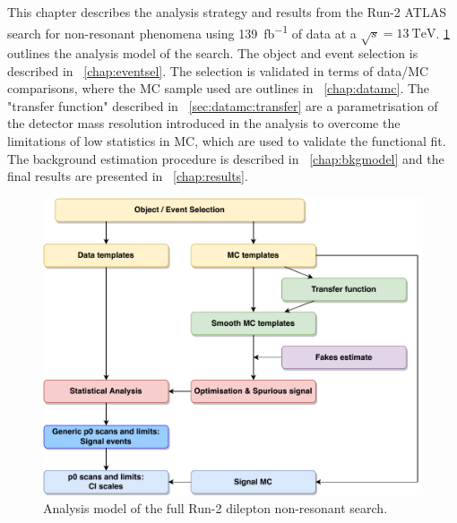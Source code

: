 This chapter describes the analysis strategy and results from the Run-2 ATLAS search for non-resonant phenomena using \SI{139}{\femto\barn^{-1}} of data at a $\sqrt{s}=\SI{13}{\tera\electronvolt}$. \cref{fig:nonres:intro:analysismodel} outlines the analysis model of the search. The object and event selection is described in ~\cref{chap:eventsel}. The selection is validated in terms of data/MC comparisons, where the MC sample used are outlines in ~\cref{chap:datamc}. The "transfer function" described in ~\cref{sec:datamc:transfer} are a parametrisation of the detector mass resolution introduced in the analysis to overcome the limitations of low statistics in MC, which are used to validate the functional fit. The background estimation procedure is described in ~\cref{chap:bkgmodel} and the final results are presented in ~\cref{chap:results}.

\begin{figure}[h]
    \centering
    \includegraphics[width=\mediumfigwidth]{figures/analysis/introduction/AnalysisOverview.pdf}
    \caption[Analysis model of the full Run-2 dilepton non-resonant search]{Analysis model of the full Run-2 dilepton non-resonant search.}
    \label{fig:nonres:intro:analysismodel}
\end{figure}
\clearpage